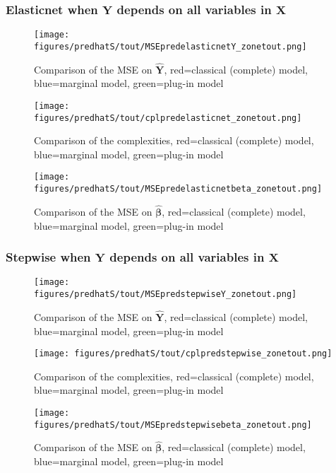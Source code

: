\documentclass[12pt,a4paper]{report}
\begin{document}
\subsubsection{Elasticnet when $\boldsymbol{Y}$ depends on all variables in $\boldsymbol{X}$}

	\begin{figure}[h!]
	\centering
		  \texttt{[image: figures/predhatS/tout/MSEpredelasticnetY\_zonetout.png]}
		\caption{Comparison of the MSE on $\hat{\boldsymbol{Y}}$, red=classical (complete) model, blue=marginal model, green=plug-in model}\label{MSEpredelasticnetY_zonetout}
	\end{figure}
	\begin{figure}[h!]
	\centering
		  \texttt{[image: figures/predhatS/tout/cplpredelasticnet\_zonetout.png]}
		\caption{Comparison of the complexities, red=classical (complete) model, blue=marginal model, green=plug-in model}\label{cplpredelasticnet_zonetout}
	\end{figure}
	\begin{figure}[h!]
	\centering
		  \texttt{[image: figures/predhatS/tout/MSEpredelasticnetbeta\_zonetout.png]}
		\caption{Comparison of the MSE on $\hat{\boldsymbol{\beta}}$, red=classical (complete) model, blue=marginal model, green=plug-in model}\label{MSEpredelasticnetbeta_zonetout}
	\end{figure}
	\FloatBarrier
\newpage
\subsubsection{Stepwise when $\boldsymbol{Y}$ depends on all variables in $\boldsymbol{X}$}

	\begin{figure}[h!]
	\centering
		  \texttt{[image: figures/predhatS/tout/MSEpredstepwiseY\_zonetout.png]}
		\caption{Comparison of the MSE on $\hat{\boldsymbol{Y}}$, red=classical (complete) model, blue=marginal model, green=plug-in model}\label{MSEpredstepwiseY_zonetout}
	\end{figure}
	\begin{figure}[h!]
	\centering
		  \texttt{[image: figures/predhatS/tout/cplpredstepwise\_zonetout.png]}
		\caption{Comparison of the complexities, red=classical (complete) model, blue=marginal model, green=plug-in model}\label{cplpredstepwise_zonetout}
	\end{figure}
	\begin{figure}[h!]
	\centering
		  \texttt{[image: figures/predhatS/tout/MSEpredstepwisebeta\_zonetout.png]}
		\caption{Comparison of the MSE on $\hat{\boldsymbol{\beta}}$, red=classical (complete) model, blue=marginal model, green=plug-in model}\label{MSEpredstepwisebeta_zonetout}
	\end{figure}
	\FloatBarrier
\newpage
\end{document}

